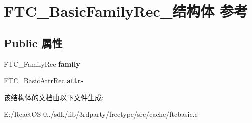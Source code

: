 \hypertarget{struct_f_t_c___basic_family_rec__}{}\section{F\+T\+C\+\_\+\+Basic\+Family\+Rec\+\_\+结构体 参考}
\label{struct_f_t_c___basic_family_rec__}
\subsection*{Public 属性}
\begin{DoxyCompactItemize}
\item 
\mbox{\label{struct_f_t_c___basic_family_rec___a8ec968ff70bb3fd60fbb711d8c72e2c1}} 
F\+T\+C\+\_\+\+Family\+Rec {\bfseries family}
\item 
\mbox{\label{struct_f_t_c___basic_family_rec___a84fe37c292128a29aaa6c30ee12e1963}} 
\hyperlink{struct_f_t_c___basic_attr_rec__}{F\+T\+C\+\_\+\+Basic\+Attr\+Rec} {\bfseries attrs}
\end{DoxyCompactItemize}


该结构体的文档由以下文件生成\+:\begin{DoxyCompactItemize}
\item 
E\+:/\+React\+O\+S-\/0../sdk/lib/3rdparty/freetype/src/cache/ftcbasic.\+c\end{DoxyCompactItemize}
